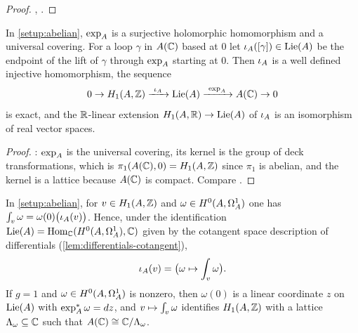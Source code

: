 \begin{proof}
\cite[\S 1]{Mumford1974}, \cite[\S 1.4]{BirkenhakeLange2004}.
\end{proof}

\begin{lemma}[Uniformisation]\label{lem:uniformisation}
In \cref{setup:abelian}, $\exp_{A}$ is a surjective holomorphic
homomorphism and a universal covering. For a loop $\gamma$ in $A(\mathbb{C})$ based
at $0$ let $\iota_{A}([\gamma]) \in \mathrm{Lie}(A)$ be the endpoint of
the lift of $\gamma$ through $\exp_{A}$ starting at $0$. Then
$\iota_{A}$ is a well defined injective homomorphism, the sequence
\[
  0 \to \Homology{A}{\ZZ} \xrightarrow{\ \PeriodInclusion{A}\ } \LieAlg{A}
  \xrightarrow{\ \ExpMap{A}\ } A(\CC) \to 0
\]
is exact, and the $\mathbb{R}$-linear extension
$H_{1}(A,\mathbb{R}) \to \mathrm{Lie}(A)$ of $\iota_{A}$ is an isomorphism
of real vector spaces.
\end{lemma}

\begin{proof}
\cite[\S 1]{Mumford1974}: $\exp_{A}$ is the universal covering, its kernel
is the group of deck transformations, which is
$\pi_1(A(\mathbb{C}), 0) = H_{1}(A,\mathbb{Z})$ since $\pi_1$ is abelian, and the
kernel is a lattice because $A(\mathbb{C})$ is compact. Compare
\cite[IV.5.1]{DeligneRapoport1973}.
\end{proof}

\begin{proposition}\label{prop:canonical-period-map}
In \cref{setup:abelian}, for $v \in H_{1}(A,\mathbb{Z})$ and
$\omega \in H^{0}(A,\Omega^{1}_{A})$ one has
$\int_{v}\omega = \omega(0)\bigl(\iota_{A}(v)\bigr)$. Hence,
under the identification $\mathrm{Lie}(A) = \operatorname{Hom}_{\mathbb{C}}(H^{0}(A,\Omega^{1}_{A}), \mathbb{C})$
given by the cotangent space description of differentials
(\cref{lem:differentials-cotangent}),
\[
  \iota_{A}(v) = \bigl(\omega \mapsto \int_{v}\omega\bigr).
\]
If $g = 1$ and $\omega \in H^{0}(A,\Omega^{1}_{A})$ is nonzero, then $\omega(0)$ is
a linear coordinate $z$ on $\mathrm{Lie}(A)$ with $\exp_{A}^{*}\omega = dz$,
and $v \mapsto \int_{v}\omega$ identifies $H_{1}(A,\mathbb{Z})$ with a
lattice $\Lambda_{\omega} \subseteq \mathbb{C}$ such that $A(\mathbb{C}) \cong \mathbb{C}/\Lambda_{\omega}$.
\end{proposition}

